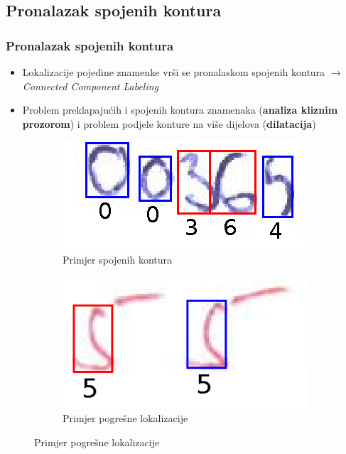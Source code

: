 \documentclass{beamer}
\begin{document}
\subsection{Pronalazak spojenih kontura}
\begin{frame}
	\frametitle{Pronalazak spojenih kontura}
		\begin{itemize}
			\item Lokalizacije pojedine znamenke vrši se pronalaskom spojenih kontura $\rightarrow$ \textit{Connected Component Labeling}
			\item Problem preklapajućih i spojenih kontura znamenaka (\textbf{analiza kliznim prozorom}) i problem podjele konture na više dijelova (\textbf{dilatacija})
		\end{itemize}

\begin{figure}
	\begin{subfigure}[t]{.4\textwidth}
		\centering
		\includegraphics[width=\linewidth]{spojene_konture.png}
		\caption{Primjer spojenih kontura}
	\end{subfigure}
	\hfill
	\begin{subfigure}[t]{.4\textwidth}
		\centering
		\includegraphics[width=\linewidth]{error_3.png}
		\caption{Primjer pogrešne lokalizacije}
	\end{subfigure}
\end{figure}
\end{frame}
\end{document}
